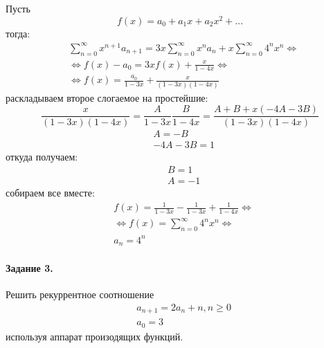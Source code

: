 \documentclass[a4paper,12pt]{article}
\begin{document}
\begin{Solution}
Пусть
\[
	f\left(x\right) = a_0 + a_1 x + a_2 x^2 + ...
\]
тогда:
\[
	\begin{split}
		& \sum_{n=0}^{\infty} x^{n+1} a_{n+1} = 3 x \sum_{n=0}^{\infty} x^n a_n + x\sum_{n=0}^{\infty} 4^n x^n  \Leftrightarrow \\
		& \Leftrightarrow f \left(x\right) - a_0 = 3x f\left(x\right) + \frac{x}{1 - 4x} \Leftrightarrow \\
		& \Leftrightarrow f\left(x\right) = \frac{a_0}{1 - 3x} + \frac{x}{\left(1-3x\right)\left(1-4x\right)}
	\end{split}
\]
раскладываем второе слогаемое на простейшие:
\[
	\frac{x}{\left(1-3x\right)\left(1-4x\right)} = \frac{A}{1-3x} \frac{B}{1-4x} = \frac{A+B + x\left(-4A - 3B\right)}{\left(1-3x\right)\left(1-4x\right)}
\]
\[
	\begin{split}
		& A = -B \\
		& -4A - 3B = 1
	\end{split}
\]
откуда получаем:
\[
	\begin{split}
		& B = 1 \\
		& A = -1
	\end{split}
\]
собираем все вместе:
\[
	\begin{split}
		& f\left(x\right) = \frac{1}{1-3x} - \frac{1}{1-3x} + \frac{1}{1-4x} \Leftrightarrow \\
		& \Leftrightarrow f \left(x\right) = \sum_{n=0}^{\infty} 4^n x^n \Leftrightarrow \\
		& a_n = 4^n
	\end{split}
\]
\end{Solution}

\paragraph{Задание 3.} Решить рекуррентное соотношение
\[
	\begin{split}
		& a_{n+1} = 2 a_n + n, n \ge 0 \\
		& a_0 = 3
	\end{split}
\]
используя аппарат произодящих функций.
\end{document}
